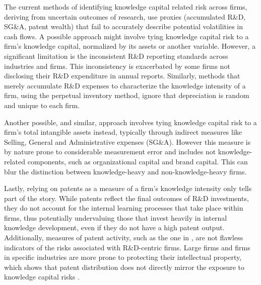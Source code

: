 \documentclass[12pt, letterpaper]{article}
\begin{document}


The current methods of identifying knowledge capital related risk across firms, deriving from uncertain outcomes of research, use proxies (accumulated R\&D, SG\&A, patent wealth) that fail to accurately describe potential volatilities in cash flows. A possible approach might involve tying knowledge capital risk to a firm's knowledge capital, normalized by its assets or another variable. However, a significant limitation is the inconsistent R\&D reporting standards across industries and firms. This inconsistency is exacerbated by some firms not disclosing their R\&D expenditure in annual reports.  Similarly, methods that merely accumulate R\&D expenses  to characterize the knowledge intensity of a firm, using the perpetual inventory method, ignore that depreciation is random and unique to each firm.

Another possible, and similar, approach involves tying knowledge capital risk to a firm's total intangible assets instead, typically through indirect measures like Selling, General and Administrative expenses (SG\&A). However this measure is by nature prone to considerable measurement error and includes not knowledge-related components, such as organizational capital and brand capital. This can blur the distinction between knowledge-heavy and non-knowledge-heavy firms.

Lastly, relying on patents as a measure of a firm's knowledge intensity only tells part of the story. While patents reflect the final outcomes of R\&D investments, they do not account for the internal learning processes that take place within firms, thus potentially undervaluing those that invest heavily in internal knowledge development, even if they do not have a high patent output. Additionally, measures of patent activity, such as the one in \cite{Kogan2017-fx}, are not flawless indicators of the risks associated with R\&D-centric firms. Large firms and firms in specific industries are more prone to protecting their intellectual property, which shows that patent distribution does not directly mirror the exposure to knowledge capital risks \citep{mezzanotti2023innovation}.
\end{document}

